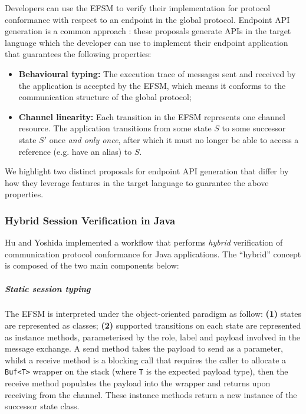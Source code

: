 Developers can use the EFSM to verify their implementation
for protocol conformance with respect to an endpoint
in the global protocol.
Endpoint API generation is a common approach
\cite{HuJava,Hybrid2016,Python2017,PureScript2019,LinearDecomp}:
these proposals generate APIs in the target language
which the developer
can use to implement their endpoint application that guarantees
the following properties:

\begin{itemize}

\item \textbf{Behavioural typing:}
The execution trace of messages sent and received by
the application is accepted by the EFSM, which means it
conforms to the communication structure of the global protocol;

\item \textbf{Channel linearity:}
Each transition in the EFSM represents one channel resource.
The application transitions from some state $S$
to some successor state $S'$
once \textit{and only once},
after which it must no longer
be able to access a reference (e.g. have an alias) to $S$.
\end{itemize}

We highlight two distinct proposals for endpoint
API generation that differ
by how they leverage features in the target language
to guarantee the above properties.

\subsubsection{Hybrid Session Verification in Java \cite{Hybrid2016}}
Hu and Yoshida implemented a workflow
that performs \textit{hybrid} verification of 
communication protocol conformance for Java applications.
The ``hybrid'' concept is composed of the two main components below:

\subparagraph{Static session typing}
The EFSM is interpreted under the object-oriented paradigm as follow:
\textbf{(1)} states are represented as classes;
\textbf{(2)} supported transitions on each state are 
represented as instance methods,
parameterised by the role, label and payload involved 
in the message exchange. 
A send method takes the payload to send as a parameter,
whilst a receive method is a blocking call that 
requires the caller to allocate a \texttt{Buf<T>} wrapper 
on the stack (where \texttt{T} is the expected payload type),
then the receive method populates the payload into 
the wrapper and returns upon receiving from the channel. 
These instance methods return a new instance of 
the successor state class.

